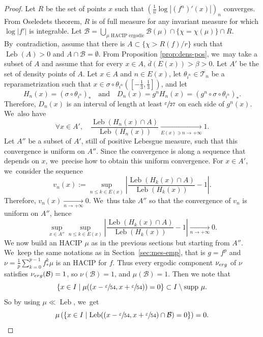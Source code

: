 \documentclass[11pt]{article}
\newcommand{\erg}{\textup{erg}}
\DeclareMathOperator{\Leb}{Leb}
\theoremstyle{definition}
\begin{document}
\begin{proof}
Let $R$ be the set of points $x$ such that $\left(\frac{1}{n} \log |(f^n)'(x)| \right)_n$ converges.
From Oseledets theorem, $R$ is of full measure for any invariant measure for which $\log |f'|$ is integrable.
Let $\mathcal{B} = \bigcup_{\mu \text{ HACIP ergodic}} \mathcal{B}(\mu) \cap \{ \chi = \chi(\mu) \} \cap R$. By~contradiction, assume that there is $A \subset \{ \chi > R(f)/r \}$ such that $\Leb(A) > 0$ and $A \cap \mathcal{B} = \emptyset$.
From Proposition \ref{prop:dens-pos}, we~may take a subset of $A$ and assume that for every $x \in A$, $\overline{d}(E(x)) > \beta > 0$.
Let $A'$ be the set of density points of $A$.
Let $x \in A$ and $n \in E(x)$, let $\theta_{i^n} \in \overline{\mathcal{T}_n}$ be a reparametrization such that $x \in \sigma \circ \theta_{i^n} \left (\left [ - \frac{1}{3}, \frac{1}{3} \right ] \right)$, and let
\[
H_n(x) = \left (\sigma \circ \theta_{i^n} \right)_* \quad \text{and} \quad D_n(x) = g^n H_n(x) = \left (g^n \circ \sigma \circ \theta_{i^n} \right)_*.
\]
Therefore, $D_n(x)$ is an interval of length at least $\sfrac{\varepsilon}{27}$ on each side of $g^n(x)$. We~also have
\[
\forall x \in A',\quad \frac{\Leb(H_n(x) \cap A)}{\Leb(H_n(x))} \underset{E(x) \ni n \to +\infty}{\longrightarrow} 1.
\]
Let $A''$ be a subset of $A'$, still of positive Lebesgue measure, such that this convergence is uniform on $A''$.
Since the convergence is along a sequence that depends on $x$, we~precise how to obtain this uniform convergence.
For $x \in A'$, we~consider the sequence
\[
v_n(x) := \sup_{n \leq k \in E(x)} \left | \frac{\Leb(H_k(x) \cap A)}{\Leb(H_k(x))} - 1 \right |.
\]
Therefore, $v_n(x) \underset{n \to +\infty}{\longrightarrow} 0$. We~thus take $A''$ so that the convergence of $v_n$ is uniform on $A''$, hence
\[
\sup_{x \in A''} \sup_{n \leq k \in E(x)} \left | \frac{\Leb(H_k(x) \cap A)}{\Leb(H_k(x))} - 1 \right | \underset{n \to +\infty}{\longrightarrow} 0.
\]
We now build an HACIP $\mu$ as in the previous sections but starting from $A''$. We~keep the same notations as in Section~\ref{sec:mes-emp}, that is $g=f^p$ and $\nu = \frac{1}{p} \sum_{k=0}^{p-1} f^k_* \mu$ is an HACIP for $f$.
Thus every ergodic component $\nu_{\erg}$ of $\nu$ satisfies $\nu_{\erg}(\mathcal{B}) = 1$, so $\nu(\mathcal{B})=1$, and $\mu(\mathcal{B}) = 1$.
Then we note that
\[
\{ x \in I \mid \mu((x - \sfrac{\varepsilon}{54}, x + \sfrac{\varepsilon}{54})) = 0 \} \subset I \setminus \text{supp } \mu.
\]
So by using $\mu \ll \Leb$, we~get
\[
\mu \left (\{ x \in I \mid \Leb((x - \sfrac{\varepsilon}{54}, x + \sfrac{\varepsilon}{54}) \cap \mathcal{B}) = 0 \} \right) = 0.
\]
\end{proof}
\end{document}
